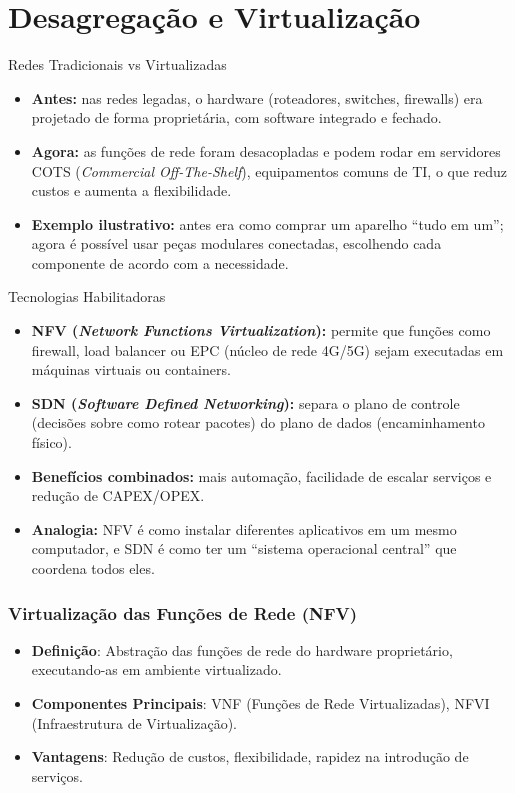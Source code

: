 \section{Desagregação e Virtualização}

\begin{frame}{Redes Tradicionais vs Virtualizadas}
\begin{itemize}
  \item \textbf{Antes:} nas redes legadas, o hardware (roteadores, switches, firewalls) era projetado de forma proprietária, com software integrado e fechado.  
  \item \textbf{Agora:} as funções de rede foram desacopladas e podem rodar em servidores COTS (\textit{Commercial Off-The-Shelf}), equipamentos comuns de TI, o que reduz custos e aumenta a flexibilidade.  
  \item \textbf{Exemplo ilustrativo:} antes era como comprar um aparelho “tudo em um”; agora é possível usar peças modulares conectadas, escolhendo cada componente de acordo com a necessidade.  
\end{itemize}
\end{frame}

\begin{frame}{Tecnologias Habilitadoras}
\begin{itemize}
  \item \textbf{NFV (\textit{Network Functions Virtualization}):} permite que funções como firewall, load balancer ou EPC (núcleo de rede 4G/5G) sejam executadas em máquinas virtuais ou containers.  
  \item \textbf{SDN (\textit{Software Defined Networking}):} separa o plano de controle (decisões sobre como rotear pacotes) do plano de dados (encaminhamento físico).  
  \item \textbf{Benefícios combinados:} mais automação, facilidade de escalar serviços e redução de CAPEX/OPEX.  
  \item \textbf{Analogia:} NFV é como instalar diferentes aplicativos em um mesmo computador, e SDN é como ter um “sistema operacional central” que coordena todos eles.  
\end{itemize}
\end{frame}

\begin{frame}
    \frametitle{Virtualização das Funções de Rede (NFV)}
    \begin{itemize}
        \item \textbf{Definição}: Abstração das funções de rede do hardware proprietário, executando-as em ambiente virtualizado.
        \item \textbf{Componentes Principais}: VNF (Funções de Rede Virtualizadas), NFVI (Infraestrutura de Virtualização).
        \item \textbf{Vantagens}: Redução de custos, flexibilidade, rapidez na introdução de serviços.
    \end{itemize}
\end{frame}

